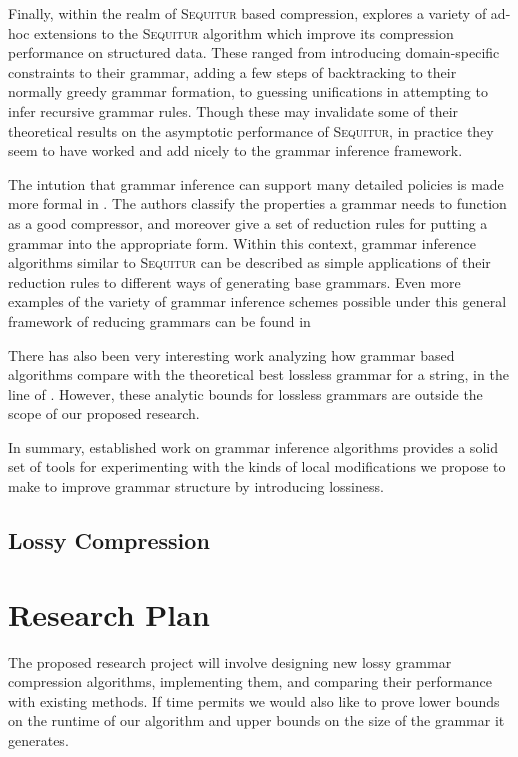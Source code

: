 \documentclass[11pt]{article}
\newcommand{\Sequitur}{\textsc{Sequitur}\xspace}
\begin{document}
Finally, within the realm of \Sequitur based compression, \cite{nevillphd}
explores a variety of ad-hoc extensions to the \Sequitur algorithm which improve
its compression performance on structured data.  These ranged from introducing
domain-specific constraints to their grammar, adding a few steps of
backtracking to their normally greedy grammar formation, to guessing
unifications in attempting to infer recursive grammar rules.  Though these may
invalidate some of their theoretical results on the asymptotic performance of
\Sequitur, in practice they seem to have worked and add nicely to the grammar
inference framework.

The intution that grammar inference can support many detailed policies is made
more formal in \cite{grammarcodes}.  The authors classify the properties a
grammar needs to function as a good compressor, and moreover give a set of
reduction rules for putting a grammar into the appropriate form.  Within this
context, grammar inference algorithms similar to \Sequitur can be described as
simple applications of their reduction rules to different ways of generating
base grammars.  Even more examples of the variety of grammar inference schemes
possible under this general framework of reducing grammars can be found in
\cite{efficientgreedy}

There has also been very interesting work analyzing how grammar based
algorithms compare with the theoretical best lossless grammar for a string, in
the line of \cite{approximation}.  However, these analytic bounds for lossless
grammars are outside the scope of our proposed research.

In summary, established work on grammar inference algorithms provides a solid
set of tools for experimenting with the kinds of local modifications we propose
to make to improve grammar structure by introducing lossiness.

\subsection{Lossy Compression}

\section{Research Plan}

The proposed research project will involve designing new lossy grammar
compression algorithms, implementing them, and comparing their performance with
existing methods.  If time permits we would also like to prove lower bounds on
the runtime of our algorithm and upper bounds on the size of the grammar it
generates.
\end{document}
